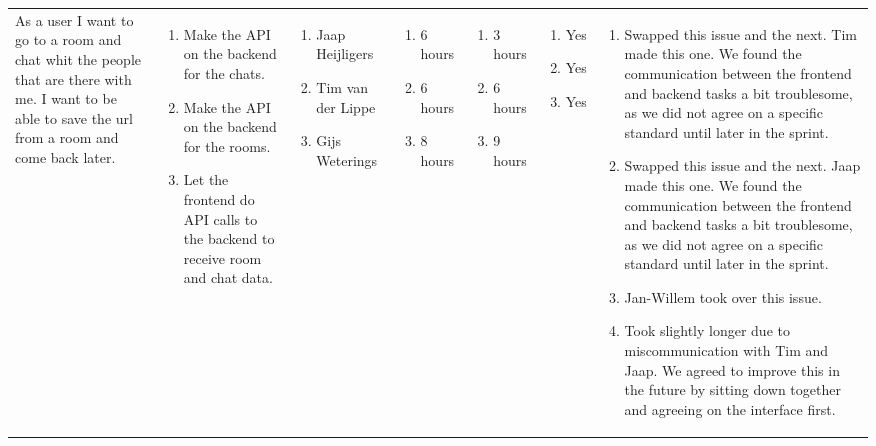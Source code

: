 \documentclass[11pt,a4paper,landscape]{article}
\begin{document}
\begin{table}[h]
\begin{tabular}{|p{3cm}|p{5.0cm}|p{3.0cm}|p{2.2cm}|p{2.2cm}|p{2.0cm}|p{5cm}}
As a user I want to go to a room and chat whit the people that are there with me.
I want to be able to save the url from a room and come back later.
&
\begin{enumerate}
\item Make the API on the backend for the chats.
\item Make the API on the backend for the rooms.
\item Let the frontend do API calls to the backend to receive room and chat data.
\end{enumerate}

&

\begin{enumerate}
\item Jaap Heijligers
\item Tim van der Lippe
\item Gijs Weterings
\end{enumerate}

&
\begin{enumerate}
\item 6 hours
\item 6 hours
\item 8 hours
\end{enumerate}

&
\begin{enumerate}
\item 3 hours
\item 6 hours
\item 9 hours
\end{enumerate}

&
\begin{enumerate}
\item Yes
\item Yes
\item Yes
\end{enumerate}
&
\begin{enumerate}
\item Swapped this issue and the next. Tim made this one. We found the communication between the frontend and backend tasks a bit troublesome, as we did not agree on a specific standard until later in the sprint.
\item Swapped this issue and the next. Jaap made this one. We found the communication between the frontend and backend tasks a bit troublesome, as we did not agree on a specific standard until later in the sprint.
\item Jan-Willem took over this issue.
\item Took slightly longer due to miscommunication with Tim and Jaap. We agreed to improve this in the future by sitting down together and agreeing on the interface first.
\end{enumerate}

\end{tabular}
\end{table}
\end{document}
